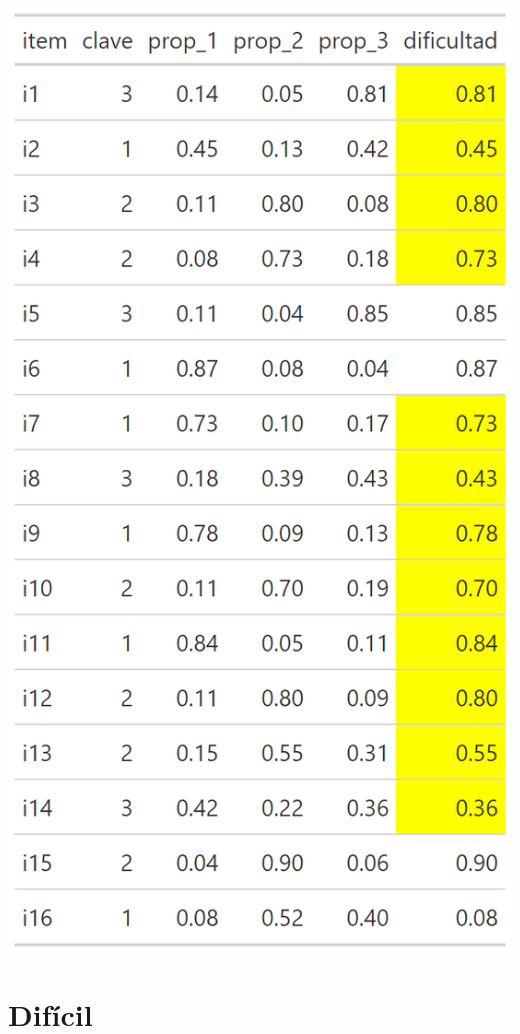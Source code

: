 \documentclass[
  letterpaper,
  DIV=11,
  numbers=noendperiod]{scrreprt}
\begin{document}
\begin{center}
\includegraphics[width=0.6\linewidth,height=\textheight,keepaspectratio]{images/teoria_clasica_diff_medio.png}
\end{center}

\section{Difícil}
\end{document}
